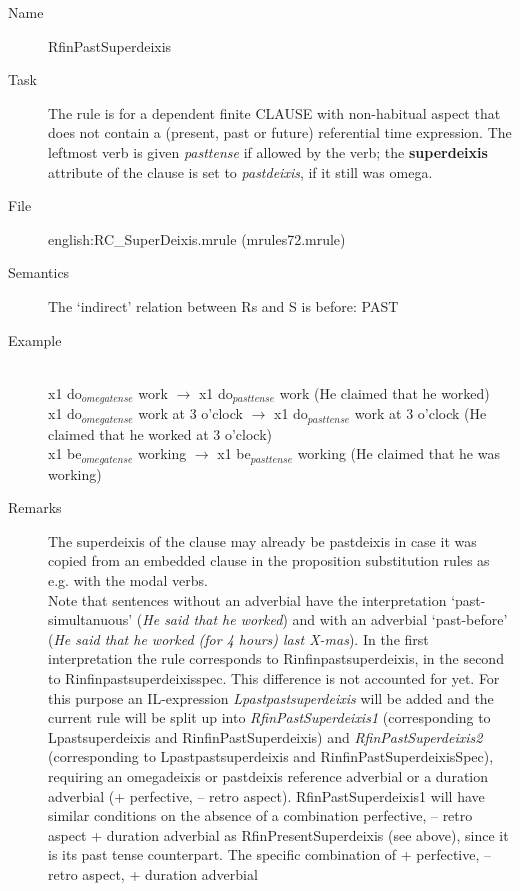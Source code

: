 \begin{description}
\vspace{1 cm}
\begin{description}
\item[Name] RfinPastSuperdeixis
\item[Task] The rule is for a dependent finite CLAUSE with non-habitual aspect
that does not contain a
(present, past or future) referential time expression. 
The leftmost verb is given {\em pasttense\/} if allowed by the verb;
the {\bf superdeixis} attribute of the clause is set to {\em pastdeixis\/}, 
if it still was omega. 
\item[File] english:RC\_SuperDeixis.mrule (mrules72.mrule)
\item[Semantics] The `indirect' relation between Rs and S is before: PAST
\item[Example] \mbox{}\\
x1 do$_{omegatense}$ work $\rightarrow$ x1 do$_{pasttense}$ work (He claimed
that he worked)\\
x1 do$_{omegatense}$ work at 3 o'clock $\rightarrow$ x1 do$_{pasttense}$ 
work at 3 o'clock (He claimed that he worked at 3 o'clock)\\
x1 be$_{omegatense}$ working $\rightarrow$ x1 be$_{pasttense}$ working (He 
claimed that he was working)
\item[Remarks] 
The superdeixis of the clause may already be  pastdeixis in 
case it was copied from an embedded  clause in the proposition substitution 
rules as e.g. with the modal verbs. \\
Note that sentences without an adverbial have the interpretation `past-
simultanuous' ({\em He said that he worked\/}) and with an adverbial 
`past-before' ({\em He said that he worked (for 4 hours) last X-mas\/}). 
In the first interpretation 
the rule corresponds to Rinfinpastsuperdeixis, in the second to 
Rinfinpastsuperdeixisspec. This difference is not accounted for yet. For this 
purpose an IL-expression {\em Lpastpastsuperdeixis} will be added and the 
current
rule will be split up into {\em RfinPastSuperdeixis1} (corresponding to 
Lpastsuperdeixis and RinfinPastSuperdeixis) and {\em RfinPastSuperdeixis2} 
(corresponding to Lpastpastsuperdeixis and RinfinPastSuperdeixisSpec), 
requiring an 
omegadeixis or pastdeixis reference adverbial or a duration adverbial 
(+ perfective, -- retro aspect). RfinPastSuperdeixis1 will have similar 
conditions on the absence of a combination perfective, -- retro aspect 
+ duration adverbial as 
RfinPresentSuperdeixis (see above), since it is its past tense counterpart. 
The specific combination of + perfective, -- retro aspect, + duration adverbial 

\end{description}
\end{description}
